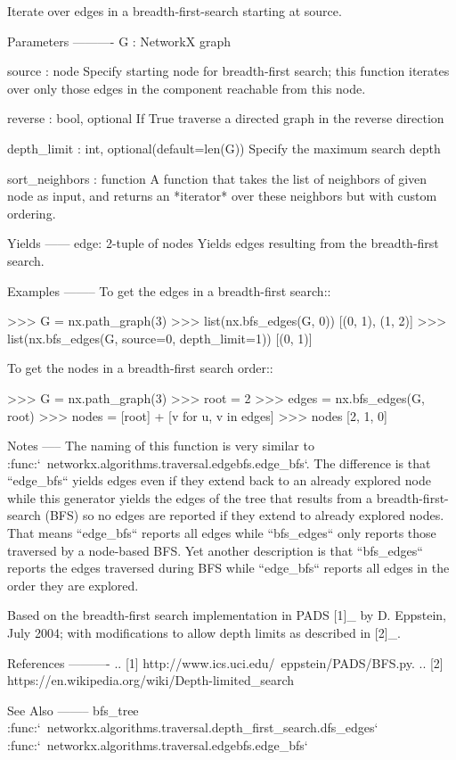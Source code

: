\begin{DoxyVerb}Iterate over edges in a breadth-first-search starting at source.

Parameters
----------
G : NetworkX graph

source : node
   Specify starting node for breadth-first search; this function
   iterates over only those edges in the component reachable from
   this node.

reverse : bool, optional
   If True traverse a directed graph in the reverse direction

depth_limit : int, optional(default=len(G))
    Specify the maximum search depth

sort_neighbors : function
    A function that takes the list of neighbors of given node as input, and
    returns an *iterator* over these neighbors but with custom ordering.

Yields
------
edge: 2-tuple of nodes
   Yields edges resulting from the breadth-first search.

Examples
--------
To get the edges in a breadth-first search::

    >>> G = nx.path_graph(3)
    >>> list(nx.bfs_edges(G, 0))
    [(0, 1), (1, 2)]
    >>> list(nx.bfs_edges(G, source=0, depth_limit=1))
    [(0, 1)]

To get the nodes in a breadth-first search order::

    >>> G = nx.path_graph(3)
    >>> root = 2
    >>> edges = nx.bfs_edges(G, root)
    >>> nodes = [root] + [v for u, v in edges]
    >>> nodes
    [2, 1, 0]

Notes
-----
The naming of this function is very similar to
:func:`~networkx.algorithms.traversal.edgebfs.edge_bfs`. The difference
is that ``edge_bfs`` yields edges even if they extend back to an already
explored node while this generator yields the edges of the tree that results
from a breadth-first-search (BFS) so no edges are reported if they extend
to already explored nodes. That means ``edge_bfs`` reports all edges while
``bfs_edges`` only reports those traversed by a node-based BFS. Yet another
description is that ``bfs_edges`` reports the edges traversed during BFS
while ``edge_bfs`` reports all edges in the order they are explored.

Based on the breadth-first search implementation in PADS [1]_
by D. Eppstein, July 2004; with modifications to allow depth limits
as described in [2]_.

References
----------
.. [1] http://www.ics.uci.edu/~eppstein/PADS/BFS.py.
.. [2] https://en.wikipedia.org/wiki/Depth-limited_search

See Also
--------
bfs_tree
:func:`~networkx.algorithms.traversal.depth_first_search.dfs_edges`
:func:`~networkx.algorithms.traversal.edgebfs.edge_bfs`\end{DoxyVerb}
